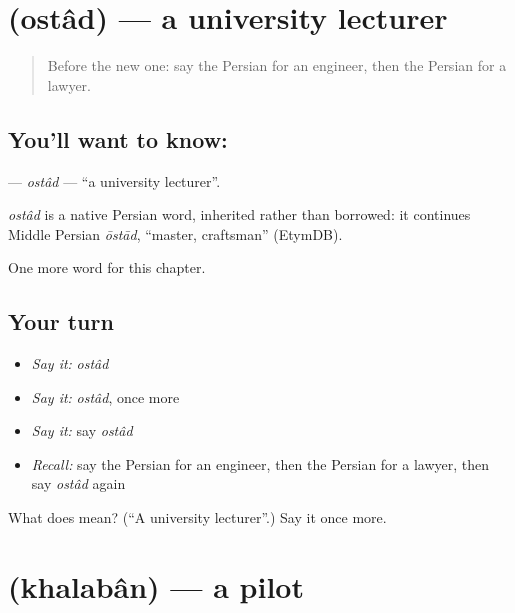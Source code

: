\section[\texorpdfstring{\fa{استاد} (ostâd)}{استاد (ostâd)}]{ (ostâd) — a university lecturer}

\label{lesson:FA-C250-ostad}



\begin{quote}
Before the new one: say the Persian for an engineer, then the Persian for a lawyer.
\end{quote}

\subsection*{You'll want to know: }
\textbf{} — \emph{ostâd} — \textquotedblleft{}a university lecturer\textquotedblright{}.

\begin{cousinweb}
\emph{ostâd} is a native Persian word, inherited rather than borrowed: it continues Middle Persian \emph{ōstād}, \textquotedblleft{}master, craftsman\textquotedblright{} (EtymDB).
\end{cousinweb}

\begin{grammarlens}[title={What you've built}]
One more word for this chapter.
\end{grammarlens}

\subsection*{Your turn}
\begin{itemize}
\raggedright
  \item \emph{Say it:} \emph{ostâd}
  \item \emph{Say it:} \emph{ostâd}, once more
  \item \emph{Say it:} say \emph{ostâd}
  \item \emph{Recall:} say the Persian for an engineer, then the Persian for a lawyer, then say \emph{ostâd} again
\end{itemize}

\begin{tcolorbox}[breakable,colback=teal!4,colframe=teal!35!black,title={Before you move on}]
What does  mean? (\textquotedblleft{}A university lecturer\textquotedblright{}.) Say it once more.
\end{tcolorbox}
\section[\texorpdfstring{\fa{خلبان} (khalabân)}{خلبان (khalabân)}]{ (khalabân) — a pilot}

